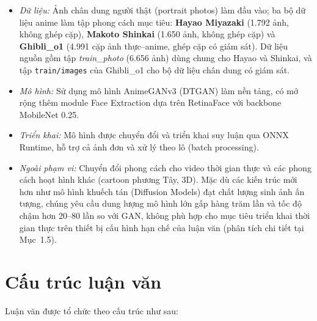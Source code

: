 \begin{itemize}
    \item \textit{Dữ liệu:} Ảnh chân dung người thật (portrait photos) làm đầu vào; ba bộ dữ liệu anime làm tập phong cách mục tiêu: \textbf{Hayao Miyazaki} (1.792 ảnh, không ghép cặp), \textbf{Makoto Shinkai} (1.650 ảnh, không ghép cặp) và \textbf{Ghibli\_o1} (4.991 cặp ảnh thực--anime, ghép cặp có giám sát). Dữ liệu nguồn gồm tập \textit{train\_photo} (6.656 ảnh) dùng chung cho Hayao và Shinkai, và tập \texttt{train/images} của Ghibli\_o1 cho bộ dữ liệu chân dung có giám sát.

    \item \textit{Mô hình:} Sử dụng mô hình AnimeGANv3 (DTGAN) \cite{Liu2024} làm nền tảng, có mở rộng thêm module Face Extraction dựa trên RetinaFace \cite{Deng2019RetinaFace} với backbone MobileNet 0.25.
    \item \textit{Triển khai:} Mô hình được chuyển đổi và triển khai suy luận qua ONNX Runtime, hỗ trợ cả ảnh đơn và xử lý theo lô (batch processing).
    \item \textit{Ngoài phạm vi:} Chuyển đổi phong cách cho video thời gian thực và các phong cách hoạt hình khác (cartoon phương Tây, 3D). Mặc dù các kiến trúc mới hơn như mô hình khuếch tán (Diffusion Models) đạt chất lượng sinh ảnh ấn tượng, chúng yêu cầu dung lượng mô hình lớn gấp hàng trăm lần và tốc độ chậm hơn 20--80 lần so với GAN, không phù hợp cho mục tiêu triển khai thời gian thực trên thiết bị cấu hình hạn chế của luận văn (phân tích chi tiết tại Mục~1.5).
\end{itemize}

\section*{Cấu trúc luận văn}

Luận văn được tổ chức theo cấu trúc như sau:

